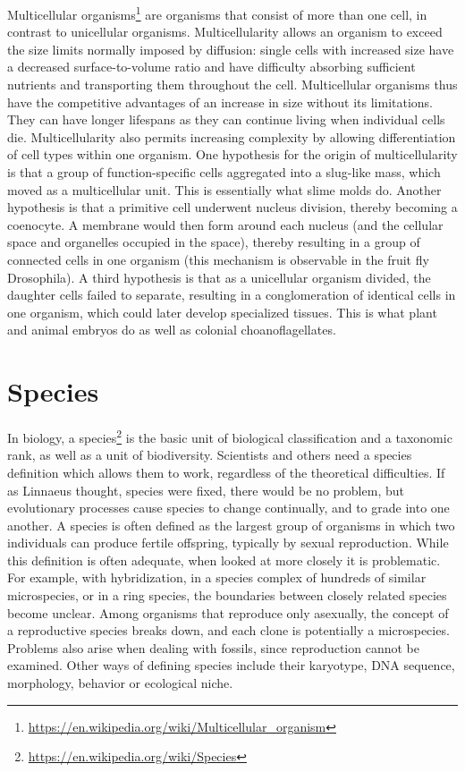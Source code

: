 \documentclass[]{book}
\let\rmarkdownfootnote\footnote%
\def\footnote{\protect\rmarkdownfootnote}
\renewcommand{\href}[2]{#2\footnote{\url{#1}}}
\theoremstyle{definition}
\theoremstyle{definition}
\theoremstyle{definition}
\theoremstyle{remark}
\begin{document}
\href{https://en.wikipedia.org/wiki/Multicellular_organism}{Multicellular
organisms} are organisms that consist of more than one cell, in contrast
to unicellular organisms. Multicellularity allows an organism to exceed
the size limits normally imposed by diffusion: single cells with
increased size have a decreased surface-to-volume ratio and have
difficulty absorbing sufficient nutrients and transporting them
throughout the cell. Multicellular organisms thus have the competitive
advantages of an increase in size without its limitations. They can have
longer lifespans as they can continue living when individual cells die.
Multicellularity also permits increasing complexity by allowing
differentiation of cell types within one organism. One hypothesis for
the origin of multicellularity is that a group of function-specific
cells aggregated into a slug-like mass, which moved as a multicellular
unit. This is essentially what slime molds do. Another hypothesis is
that a primitive cell underwent nucleus division, thereby becoming a
coenocyte. A membrane would then form around each nucleus (and the
cellular space and organelles occupied in the space), thereby resulting
in a group of connected cells in one organism (this mechanism is
observable in the fruit fly Drosophila). A third hypothesis is that as a
unicellular organism divided, the daughter cells failed to separate,
resulting in a conglomeration of identical cells in one organism, which
could later develop specialized tissues. This is what plant and animal
embryos do as well as colonial choanoflagellates.

\section{Species}\label{species}

In biology, a \href{https://en.wikipedia.org/wiki/Species}{species} is
the basic unit of biological classification and a taxonomic rank, as
well as a unit of biodiversity. Scientists and others need a species
definition which allows them to work, regardless of the theoretical
difficulties. If as Linnaeus thought, species were fixed, there would be
no problem, but evolutionary processes cause species to change
continually, and to grade into one another. A species is often defined
as the largest group of organisms in which two individuals can produce
fertile offspring, typically by sexual reproduction. While this
definition is often adequate, when looked at more closely it is
problematic. For example, with hybridization, in a species complex of
hundreds of similar microspecies, or in a ring species, the boundaries
between closely related species become unclear. Among organisms that
reproduce only asexually, the concept of a reproductive species breaks
down, and each clone is potentially a microspecies. Problems also arise
when dealing with fossils, since reproduction cannot be examined. Other
ways of defining species include their karyotype, DNA sequence,
morphology, behavior or ecological niche.
\end{document}
